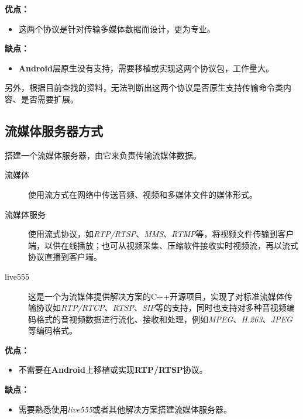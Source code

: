\documentclass[11pt,a4paper]{article}
\begin{document}
\begin{CJK}{UTF8}{gbsn}
    \textbf{优点：}
    \begin{itemize}
        \item 这两个协议是针对传输多媒体数据而设计，更为专业。
    \end{itemize}

    \textbf{缺点：}
    \begin{itemize}
        \item \textbf{Android}层原生没有支持，需要移植或实现这两个协议包，工作量大。
    \end{itemize}
    \par
    另外，根据目前查找的资料，无法判断出这两个协议是否原生支持传输命令类内容、是否需要扩展。


    \subsection{流媒体服务器方式}
    搭建一个流媒体服务器，由它来负责传输流媒体数据。
    \begin{description}
        \item[流媒体] 使用流方式在网络中传送音频、视频和多媒体文件的媒体形式。
        \item[流媒体服务] 使用流式协议，如\emph{RTP/RTSP}、\emph{MMS}、\emph{RTMP}等，将视频文件传输到客户端，以供在线播放；也可从视频采集、压缩软件接收实时视频流，再以流式协议直播到客户端。
        \item[live555] 这是一个为流媒体提供解决方案的C++开源项目，实现了对标准流媒体传输协议如\emph{RTP/RTCP}、\emph{RTSP}、\emph{SIP}等的支持，同时也支持对多种音视频编码格式的音视频数据进行流化、接收和处理，例如\emph{MPEG}、\emph{H.263}、\emph{JPEG}等编码格式。
    \end{description}

    \textbf{优点：}
    \begin{itemize}
        \item 不需要在\textbf{Android}上移植或实现\textbf{RTP/RTSP}协议。
    \end{itemize}

    \textbf{缺点：}
    \begin{itemize}
        \item 需要熟悉使用\emph{live555}或者其他解决方案搭建流媒体服务器。
    \end{itemize}


\end{CJK}
\end{document}
